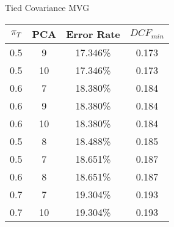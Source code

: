 \caption{Tied Covariance MVG}\label{tab:mvg_tiedcov}
\begin{center}
\begin{tabular}{|c|c|c|c|}
\hline
$\pi_T$ & PCA & Error Rate & $DCF_{min}$\\
\hline
0.5 & 9 & 17.346\% & 0.173\\
\hline
0.5 & 10 & 17.346\% & 0.173\\
\hline
0.6 & 7 & 18.380\% & 0.184\\
\hline
0.6 & 9 & 18.380\% & 0.184\\
\hline
0.6 & 10 & 18.380\% & 0.184\\
\hline
0.5 & 8 & 18.488\% & 0.185\\
\hline
0.5 & 7 & 18.651\% & 0.187\\
\hline
0.6 & 8 & 18.651\% & 0.187\\
\hline
0.7 & 7 & 19.304\% & 0.193\\
\hline
0.7 & 10 & 19.304\% & 0.193\\
\hline
\end{tabular}
\end{center}
